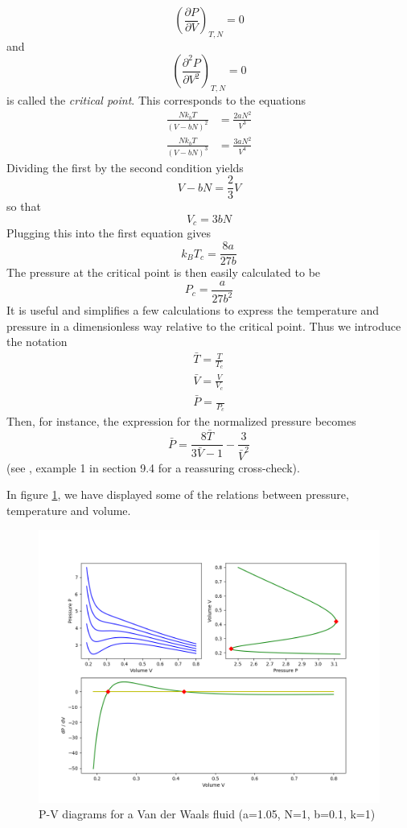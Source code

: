 \documentclass[a4paper, draft]{report}
\numberwithin{section}{chapter}
\numberwithin{equation}{chapter}
\theoremstyle{own}
\theoremstyle{remark}
\begin{document}
$$
(\frac{\partial P}{\partial V})_{T,N}  = 0
$$
and
$$
(\frac{\partial^2 P}{\partial V^2})_{T,N}  = 0
$$
is called the {\em critical point}. This corresponds to the equations
\begin{align*}
\frac{N k_b T}{(V-bN)^2} &= \frac{2aN^2}{V^3} \\
\frac{N k_b T}{(V-bN)^3} &= \frac{3aN^2}{V^4} 
\end{align*}
Dividing the first by the second condition yields
$$
V - bN = \frac{2}{3} V
$$
so that 
$$
V_c = 3 b N
$$
Plugging this into the first equation gives
$$
k_B T_c =  \frac{8a}{27b}
$$
The pressure at the critical point is then easily calculated to be
$$
P_c = \frac{a}{27b^2}
$$
It is useful and simplifies a few calculations to express the temperature and pressure in a dimensionless way relative to the critical point. Thus we introduce the notation
\begin{align*}
\bar{T} = \frac{T}{T_c} \\
\bar{V} = \frac{V}{V_c} \\
\bar{P} = \frac{}{P_c} 
\end{align*}
Then, for instance, the expression for the normalized pressure becomes
$$
\bar{P} = \frac{8 \bar{T}}{3 \bar{V}-1} - \frac{3}{\bar{V}^2}
$$
(see \cite{Callen}, example 1 in section 9.4 for a reassuring cross-check).

In figure \ref{fig:VanDerWaals}, we have displayed some of the relations between pressure, temperature and volume. 


\begin{figure}[ht]
\centering
\includegraphics[scale=.5]{VanDerWaals}
\caption{P-V diagrams for a Van der Waals fluid (a=1.05, N=1, b=0.1, k=1)}
\label{fig:VanDerWaals}
\end{figure}
\end{document}
